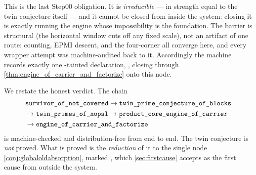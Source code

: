 This is the last Step00 obligation. It is \emph{irreducible} --- in strength equal to the twin
conjecture itself --- and it cannot be closed from inside the system: closing it is exactly running the
engine whose impossibility is the foundation. The barrier is structural (the horizontal window cuts off
any fixed scale), not an artifact of one route: counting, EPMI descent, and the four-corner all
converge here, and every wrapper attempt was machine-audited back to it. Accordingly the machine
records exactly one -tainted declaration, , closing through
\cref{thm:engine_of_carrier_and_factorize} onto this node.

\begin{remark}
We restate the honest verdict. The chain
\[
\begin{aligned}
  &\texttt{survivor\_of\_not\_covered}\to\texttt{twin\_prime\_conjecture\_of\_blocks}\\
  &\to\texttt{twin\_primes\_of\_nopsl}\to\texttt{product\_core\_engine\_of\_carrier}\\
  &\to\texttt{engine\_of\_carrier\_and\_factorize}
\end{aligned}
\]
is \green{} machine-checked and distribution-free from end to end. The twin conjecture is
\emph{not} proved. What is proved is the \emph{reduction} of it to the single node
\cref{conj:globaloldabsorption}, marked \red{}, which \cref{sec:firstcause} accepts as the first
cause \axiom{} from outside the system.
\end{remark}
